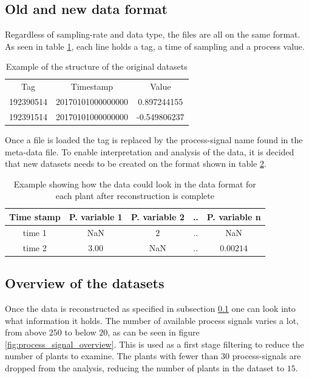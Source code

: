     \subsection{Old and new data format}\label{subsec:data_format}
        Regardless of sampling-rate and data type, the files are all on the same format. As seen in table \ref{tab:orig_data}, each line holds a tag, a time of sampling and a process value. 
        \begin{table}[h]
            \centering
            \begin{tabular}{|c c c|}
                \hline
                 Tag        & Timestamp         & Value  \\
                 192390514  & 20170101000000000 & 0.897244155 \\
                 192391514  & 20170101000000000 & -0.549806237 \\
                 \hline
            \end{tabular}
            \caption{Example of the structure of the original datasets}
            \label{tab:orig_data}
        \end{table}
        Once a file is loaded the tag is replaced by the process-signal name found in the meta-data file. To enable interpretation and analysis of the data, it is decided that new datasets needs to be created on the format shown in table \ref{tab:plant_format}.
        \begin{table}[h]
            \centering
            \begin{tabular}{|c|c|c|c|c|}
                \hline
                Time stamp & P. variable 1     & P. variable 2    & ..    & P. variable n    \\ \hline
                time 1        & NaN         & $2$           & ..    & NaN         \\ \hline
                time 2        & $3.00$      & NaN           & ..    & $0.00214$\\ \hline
            \end{tabular}
            \caption{Example showing how the data could look in the data format for each plant after reconstruction is complete}
            \label{tab:plant_format}
        \end{table}

        
    \subsection{Overview of the datasets}
        Once the data is reconstructed as specified in subsection \ref{subsec:data_format} one can look into what information it holds. The number of available process signals varies a lot, from above $250$ to below $20$, as can be seen in figure \ref{fig:process_signal_overview}. This is used as a first stage filtering to reduce the number of plants to examine. The plants with fewer than $30$ process-signals are dropped from the analysis, reducing the number of plants in the dataset to $15$.    
        
